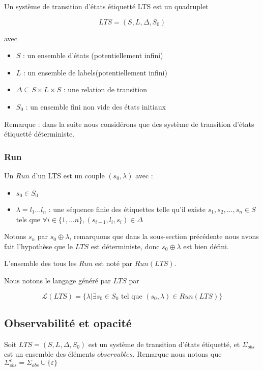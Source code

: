 \documentclass[10pt,a4paper]{article}
\begin{document}
Un syst\`eme de transition d'\'etats \'etiquett\'e LTS est un quadruplet 

$$LTS = (S,L,\Delta,S_0)$$

avec
\begin{itemize}
	\item $S$ : un ensemble d'\'etats (potentiellement infini)
	\item $L$ : un ensemble de labels(potentiellement infini)
	\item $\Delta \subseteq S\times L \times S$ : une relation de transition
	\item $S_0$ : un ensemble fini non vide des \'etats initiaux 
\end{itemize}

Remarque : dans la suite nous consid\'erons que des syst\`eme de transition d'\'etats \'etiquett\'e d\'eterministe.

\subsubsection{Run}

Un $Run$ d'un LTS est un couple $(s_0,\lambda)$ avec :

\begin{itemize}
	\item $s_0 \in S_0$
	\item $\lambda = l_1 \dots l_n$ : une s\'equence finie des \'etiquettes telle qu'il existe $s_1,s_2,\dots ,s_n \in S$ tels que $\forall i \in \{1, \dots n\}, (s_{i-1},l_i,s_i) \in \Delta$ 
\end{itemize}

Notons $s_n$ par $s_0\oplus \lambda$, remarquons que dans la sous-section pr\'ec\'edente nous avons fait l'hypoth\`ese que le $LTS$ est d\'eterministe, donc $s_0\oplus \lambda$ est bien d\'efini.

L'ensemble des tous les $Run$ est not\'e par $Run(LTS)$.

Nous notons le langage g\'en\'er\'e par $LTS$ par 

$$\mathcal{L}(LTS) = \{\lambda | \exists s_0 \in S_0 \mbox{ tel que } (s_0,\lambda) \in Run(LTS)\}$$


\subsection{Observabilit\'e et opacit\'e}

Soit $LTS=(S,L,\Delta,S_0)$ est un syst\`eme de transition d'\'etats \'etiquett\'e, et $\Sigma_{obs}$ est un ensemble des \'el\'ements $observables$. Remarque nous notons que $\Sigma_{obs}^{\varepsilon} = \Sigma_{obs} \cup \{\varepsilon\}$
\end{document}
